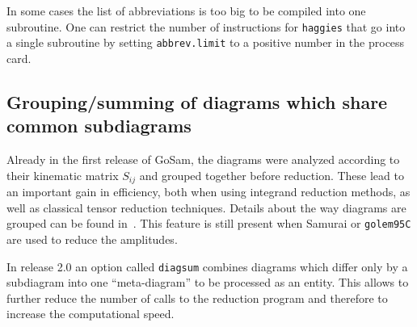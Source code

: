 \documentclass[11pt,a4paper]{refrep}
\newcommand{\gosam}{{\sc GoSam}\xspace}
\newcommand{\golemVC}{{\tt golem95C}\xspace}
\newcommand{\haggies}{{\tt haggies}\xspace}
\newcommand{\samurai}{{\sc Samurai}\xspace}
\begin{document}
In some cases the list of abbreviations is too big to
be compiled into one subroutine. One can restrict the number of instructions for \haggies{}
that go into a single subroutine by setting \texttt{abbrev.limit} to a positive
number in the process card. 


\subsection{Grouping/summing of diagrams which share common subdiagrams}
\label{sec:grouping_summing}
Already in the first release of \gosam{}, the diagrams were analyzed
according to their kinematic matrix $S_{ij}$ and grouped together
before reduction. These lead to an important gain in efficiency, both
when using integrand reduction methods, as well as 
classical tensor reduction techniques. Details about the way diagrams
are grouped can be found in~\cite{Cullen:2011ac}. This feature is
still present when \samurai{} or \golemVC{} are used to reduce the
amplitudes.

In release 2.0 an option called {\tt diagsum} combines diagrams
which differ only by a subdiagram into one ``meta-diagram'' to be
processed as an entity. This allows to further reduce the number of
calls to the reduction program and therefore to increase the
computational speed. 
\end{document}
